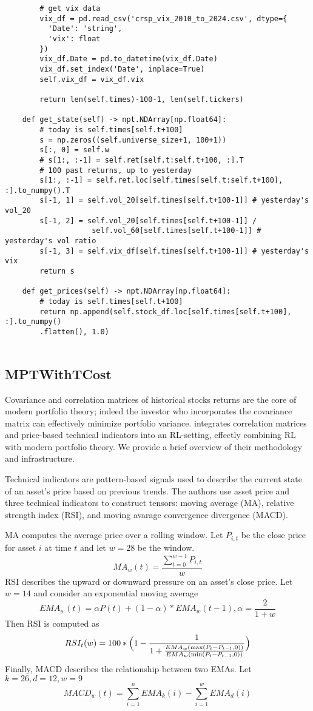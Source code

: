 \begin{verbatim}
        # get vix data
        vix_df = pd.read_csv('crsp_vix_2010_to_2024.csv', dtype={
          'Date': 'string',
          'vix': float
        })
        vix_df.Date = pd.to_datetime(vix_df.Date)
        vix_df.set_index('Date', inplace=True)
        self.vix_df = vix_df.vix
        
        return len(self.times)-100-1, len(self.tickers)
    
    def get_state(self) -> npt.NDArray[np.float64]:
        # today is self.times[self.t+100]
        s = np.zeros((self.universe_size+1, 100+1))
        s[:, 0] = self.w
        # s[1:, :-1] = self.ret[self.t:self.t+100, :].T
        # 100 past returns, up to yesterday
        s[1:, :-1] = self.ret.loc[self.times[self.t:self.t+100], :].to_numpy().T
        s[-1, 1] = self.vol_20[self.times[self.t+100-1]] # yesterday's vol_20
        s[-1, 2] = self.vol_20[self.times[self.t+100-1]] / 
                    self.vol_60[self.times[self.t+100-1]] # yesterday's vol ratio
        s[-1, 3] = self.vix_df[self.times[self.t+100-1]] # yesterday's vix
        return s

    def get_prices(self) -> npt.NDArray[np.float64]:
        # today is self.times[self.t+100]
        return np.append(self.stock_df.loc[self.times[self.t+100], :].to_numpy()
        .flatten(), 1.0)
  
\end{verbatim}

\subsection{MPTWithTCost}

Covariance and correlation matrices of historical stocks returns are the core of modern portfolio theory; 
indeed the investor 
who incorporates the covariance matrix can effectively minimize portfolio variance. 
\cite{drl_modern_portfolio_theory} integrates correlation matrices and price-based technical 
indicators into an RL-setting, effectly combining RL with modern portfolio theory. We provide a brief overview 
of their methodology and infrastructure.

Technical indicators are pattern-based signals used to describe the current state 
of an asset's price based on previous trends. The authors use asset price and three technical indicators to construct 
tensors: moving average (MA), relative strength index (RSI), and moving avarage convergence divergence (MACD).

MA computes the average price over a rolling window. Let $P_{i,t}$ be the close 
price for asset $i$ at time $t$ and let $w = 28$ be the window. 
\[MA_w(t) = \frac{\sum_{t=0}^{w-1}P_{i, t}}{w}\] 
RSI describes the upward or downward pressure on an asset's close price.
Let $w=14$ and consider an exponential moving average 
\[EMA_w(t) = \alpha P(t) + (1-\alpha) * EMA_w(t-1), \alpha = \frac{2}{1 + w}\]
Then RSI is computed as 
\[RSI_t(w) = 100 * \Bigl(1 - \frac{1}{1 + \frac{EMA_w(\max(P_t - P_{t-1}, 0))}{EMA_w(\min(P_t - P_{t-1}, 0))}}\Bigr)\]
Finally, MACD describes the relationship between two EMAs. Let $k = 26, d=12, w=9$
\[MACD_w(t) = \sum_{i=1}^n EMA_k(i) - \sum_{i=1}^w EMA_d(i)\]

